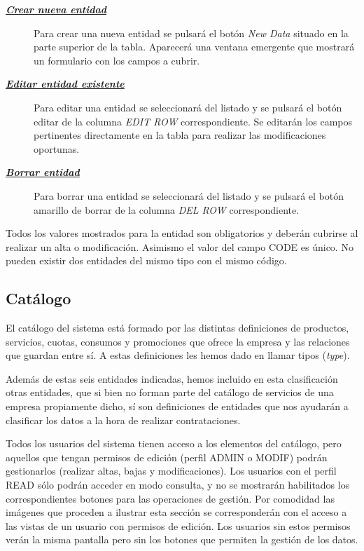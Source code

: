\begin{description}
\item[\underline{\textsl{\textbf{Crear nueva entidad}}}] Para crear una nueva entidad se pulsará el botón \textit{New Data} situado en la parte superior de la tabla. Aparecerá una ventana emergente que mostrará un formulario con los campos a cubrir.

\item[\underline{\textsl{\textbf{Editar entidad existente}}}] Para editar una entidad se seleccionará del listado y se pulsará el botón editar de la columna \textit{EDIT ROW} correspondiente. Se editarán los campos pertinentes directamente en la tabla para realizar las modificaciones oportunas. 

\item[\underline{\textsl{\textbf{Borrar entidad}}}] Para borrar una entidad se seleccionará del listado y se pulsará el botón amarillo de borrar de la columna \textit{DEL ROW} correspondiente.
\end{description}

Todos los valores mostrados para la entidad son obligatorios y deberán cubrirse al realizar un alta o modificación. Asimismo el valor del campo CODE es único. No pueden existir dos entidades del mismo tipo con el mismo código.


\subsection{Catálogo}
\label{sub:catálogo}

El catálogo del sistema está formado por las distintas definiciones de productos, servicios, cuotas, consumos y promociones que ofrece la empresa y las relaciones que guardan entre sí. A estas definiciones les hemos dado en llamar tipos (\textit{type}).

Además de estas seis entidades indicadas, hemos incluido en esta clasificación otras entidades, que si bien no forman parte del catálogo de servicios de una empresa propiamente dicho, sí son definiciones de entidades que nos ayudarán a clasificar los datos a la hora de realizar contrataciones.


Todos los usuarios del sistema tienen acceso a los elementos del catálogo, pero aquellos que tengan permisos de edición (perfil ADMIN o MODIF) podrán gestionarlos (realizar altas, bajas y modificaciones). Los usuarios con el perfil READ sólo podrán acceder en modo consulta, y no se mostrarán habilitados los correspondientes botones para las operaciones de gestión. Por comodidad las imágenes que proceden a ilustrar esta sección se corresponderán con el acceso a las vistas de un usuario con permisos de edición. Los usuarios sin estos permisos verán la misma pantalla pero sin los botones que permiten la gestión de los datos.


